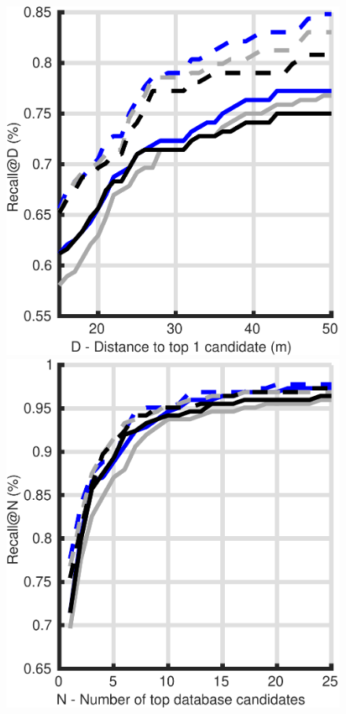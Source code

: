 \begin{figure}
	\center
	\begin{minipage}{0.19\linewidth}
		\center \scriptsize
		\includegraphics[width=\linewidth]{plot/depth_vs_ref/Results_lt_queries/distance}	
		
		\includegraphics[width=\linewidth]{plot/depth_vs_ref/Results_lt_queries/recall}
		

\end{minipage}
\end{figure}

